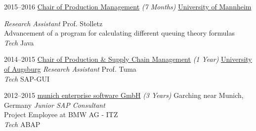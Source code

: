 \documentclass[hidelinks]{cv-style}          %
\begin{document}
\begin{entrylist}


\entry
{2015--2016}
{\href{https://stolletz.bwl.uni-mannheim.de/home}{Chair of Production Management} {\normalfont \emph{(7 Months)}}}
{\href{https://www.wim.uni-mannheim.de/de/fakultaet/}{University of Mannheim}}
{\emph{Research Assistant}  Prof. Stolletz\\
Advancement of a program for calculating different queuing theory formulas\\
\emph{Tech} Java

}




\entry
{2014--2015}
{\href{http://www.wiwi.uni-augsburg.de/bwl/tuma/}{Chair of Production \& Supply Chain Management} {\normalfont \emph{(1 Year)}}}
{\href{http://www.wiwi.uni-augsburg.de/studium/studiengaenge/win/}{University of Augsburg}}
{\emph{Research Assistant}  Prof. Tuma \\
\emph{Tech} SAP-GUI
}




\entry
{2012--2015}
{\href{http://www.munich-enterprise.com}{munich enterprise software GmbH} {\normalfont \emph{(3 Years)}}}
{Garching near Munich, Germany}
{\emph{Junior SAP Consultant}\\
Project Employee at BMW AG - ITZ \\
\emph{Tech} ABAP
}







\end{entrylist}
\end{document}
